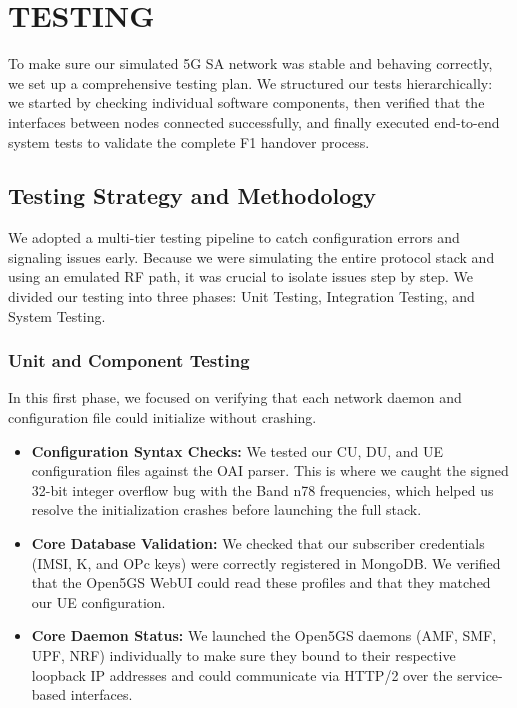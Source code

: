 \chapter{TESTING}

\justify
To make sure our simulated 5G SA network was stable and behaving correctly, we set up a comprehensive testing plan. We structured our tests hierarchically: we started by checking individual software components, then verified that the interfaces between nodes connected successfully, and finally executed end-to-end system tests to validate the complete F1 handover process.

\section{Testing Strategy and Methodology}
\justify
We adopted a multi-tier testing pipeline to catch configuration errors and signaling issues early. Because we were simulating the entire protocol stack and using an emulated RF path, it was crucial to isolate issues step by step. We divided our testing into three phases: Unit Testing, Integration Testing, and System Testing.

\subsection{Unit and Component Testing}
In this first phase, we focused on verifying that each network daemon and configuration file could initialize without crashing.
\begin{itemize}[leftmargin=*]
    \item \textbf{Configuration Syntax Checks:} We tested our CU, DU, and UE configuration files against the OAI parser. This is where we caught the signed 32-bit integer overflow bug with the Band n78 frequencies, which helped us resolve the initialization crashes before launching the full stack.
    \item \textbf{Core Database Validation:} We checked that our subscriber credentials (IMSI, K, and OPc keys) were correctly registered in MongoDB. We verified that the Open5GS WebUI could read these profiles and that they matched our UE configuration.
    \item \textbf{Core Daemon Status:} We launched the Open5GS daemons (AMF, SMF, UPF, NRF) individually to make sure they bound to their respective loopback IP addresses and could communicate via HTTP/2 over the service-based interfaces.
\end{itemize}

